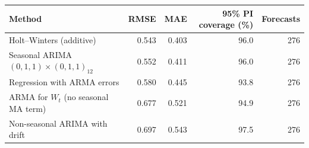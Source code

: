 \begin{tabular}{lrrrr}
\toprule
Method & RMSE & MAE & 95\% PI coverage (\%) & Forecasts\\
\midrule
Holt--Winters (additive) & 0.543 & 0.403 & 96.0 & 276\\
Seasonal ARIMA$(0,1,1)\times(0,1,1)_{12}$ & 0.552 & 0.411 & 96.0 & 276\\
Regression with ARMA errors & 0.580 & 0.445 & 93.8 & 276\\
ARMA for $W_t$ (no seasonal MA term) & 0.677 & 0.521 & 94.9 & 276\\
Non-seasonal ARIMA with drift & 0.697 & 0.543 & 97.5 & 276\\
\bottomrule
\end{tabular}
